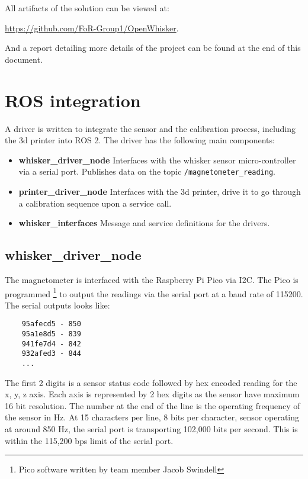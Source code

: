 \documentclass{report}
\begin{document}
All artifacts of the solution can be viewed at:

\url{https://github.com/FoR-Group1/OpenWhisker}.

And a report detailing more details of the project can be found at the end of this document.

\vspace{20px}


\section{ROS integration}

A driver is written to integrate the sensor and the calibration process, including the 3d printer into ROS 2. The driver has the following main components:

\begin{itemize}
    \item \textbf{whisker\_driver\_node} Interfaces with the whisker sensor micro-controller via a serial port. Publishes data on the topic \verb|/magnetometer_reading|.
    \item  \textbf{printer\_driver\_node} Interfaces with the 3d printer, drive it to go through a calibration sequence upon a service call.
    \item \textbf{whisker\_interfaces} Message and service definitions for the drivers.
\end{itemize}

\subsection{whisker\_driver\_node}

The magnetometer is interfaced with the Raspberry Pi Pico via I2C. The Pico is programmed \footnote{Pico software written by team member Jacob Swindell} to output the readings via the serial port at a baud rate of 115200. The serial outputs looks like:
\begin{verbatim}
    95afecd5 - 850
    95a1e8d5 - 839
    941fe7d4 - 842
    932afed3 - 844
    ...
\end{verbatim}

The first 2 digits is a sensor status code followed by hex encoded reading for the x, y, z axis. Each axis is represented by 2 hex digits as the sensor have maximum 16 bit resolution. The number at the end of the line is the operating frequency of the sensor in Hz. At 15 characters per line, 8 bits per character, sensor operating at around 850 Hz, the serial port is transporting 102,000 bits per second. This is within the 115,200 bps limit of the serial port.
\end{document}
